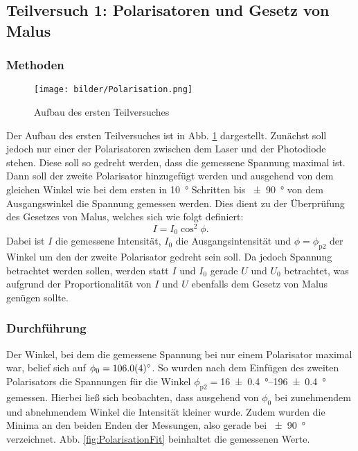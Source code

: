 \subsection{Teilversuch 1: Polarisatoren und Gesetz von Malus}
	
		\subsubsection*{Methoden}
			
			\begin{figure}[ht]
				\centering
				\texttt{[image: bilder/Polarisation.png]}
				\caption{Aufbau des ersten Teilversuches\cite{WWU}}
				\label{fig:Polarisation}	
			\end{figure}
			Der Aufbau des ersten Teilversuches ist in Abb. \ref{fig:Polarisation} dargestellt.
			Zunächst soll jedoch nur einer der Polarisatoren zwischen dem Laser und der Photodiode stehen.
			Diese soll so gedreht werden, dass die gemessene Spannung maximal ist.
			Dann soll der zweite Polarisator hinzugefügt werden und ausgehend von dem gleichen Winkel wie bei dem ersten in \SI{10}{\degree} Schritten bis \SI{+-90}{\degree} von dem Ausgangswinkel die Spannung gemessen werden.
			Dies dient zu der Überprüfung des Gesetzes von Malus, welches sich wie folgt definiert:
			\begin{equation}
				I = I_0 \cos^2{\phi}.
			\end{equation}
			Dabei ist $I$ die gemessene Intensität, $I_0$ die Ausgangsintensität und $\phi = \phi_\text{p2}$ der Winkel um den der zweite Polarisator gedreht sein soll.
			Da jedoch Spannung betrachtet werden sollen, werden statt $I$ und $I_0$ gerade $U$ und $U_0$ betrachtet, was aufgrund der Proportionalität von $I$ und $U$ ebenfalls dem Gesetz von Malus genügen sollte.
			
		\subsubsection*{Durchführung}
		
			Der Winkel, bei dem die gemessene Spannung bei nur einem Polarisator maximal war, belief sich auf $\phi_0 = \SI{106+-0,4}{\degree}$.
			So wurden nach dem Einfügen des zweiten Polarisators die Spannungen für die Winkel $\phi_\text{p2} = $\SIrange{16+-0,4}{196+-0,4}{\degree} gemessen.
			Hierbei ließ sich beobachten, dass ausgehend von $\phi_0$ bei zunehmendem und abnehmendem Winkel die Intensität kleiner wurde.
			Zudem wurden die Minima an den beiden Enden der Messungen, also gerade bei \SI{+-90}{\degree} verzeichnet.
			Abb. \ref{fig:PolarisationFit} beinhaltet die gemessenen Werte.
		
